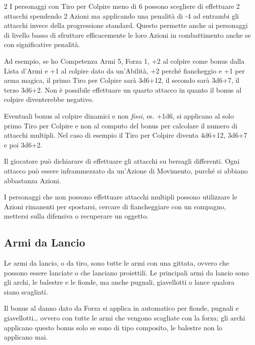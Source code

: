 \begin{multicols}{2}
I personaggi con Tiro per Colpire meno di 6 possono scegliere di effettuare 2 attacchi spendendo 2 Azioni ma applicando una penalità di -4 ad entrambi gli attacchi invece della progressione standard. Questo permette anche ai personaggi di livello basso di sfruttare efficacemente le loro Azioni in combattimento anche se con significative penalità.

\begin{giocatore}
Ad esempio, se ho Competenza Armi 5, Forza 1, +2 al colpire come bonus dalla Lista d'Armi e +1 al colpire dato da un'Abilità, +2 perché fiancheggio e +1 per arma magica, il primo Tiro per Colpire sarà 3d6+12, il secondo sarà 3d6+7, il terzo 3d6+2. Non è possibile effettuare un quarto attacco in quanto il bonus al colpire diventerebbe negativo.
\end{giocatore}

Eventuali bonus al colpire dinamici e non \emph{fissi}, es. +1d6, si applicano al solo primo Tiro per Colpire e non al computo del bonus per calcolare il numero di attacchi multipli. Nel caso di esempio il Tiro per Colpire diventa 4d6+12, 3d6+7 e poi 3d6+2.

Il giocatore può dichiarare di effettuare gli attacchi su bersagli differenti. Ogni attacco può essere inframmezzato da un'Azione di Movimento, purché si abbiano abbastanza Azioni.

I personaggi che non possono effettuare attacchi multipli possono utilizzare le Azioni rimanenti per spostarsi, cercare di fiancheggiare con un compagno, mettersi sulla difensiva o recuperare un oggetto.


%

\subsection{Armi da Lancio}\label{armidatiro}

Le armi da lancio, o da tiro, sono tutte le armi con una gittata, ovvero che possono essere lanciate o che lanciano proiettili. Le principali armi da lancio sono gli archi, le balestre e le fionde, ma anche pugnali, giavellotti o lance qualora siano scagliati.

Il bonus al danno dato da Forza si applica in automatico per fionde, pugnali e giavellotti… ovvero con tutte le armi che vengono scagliate con la forza; gli archi applicano questo bonus solo se sono di tipo composito, le balestre non lo applicano mai.


\end{multicols}

